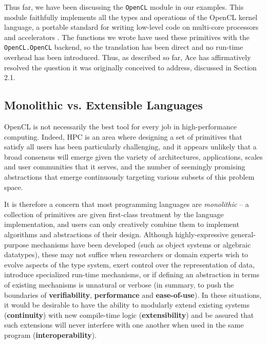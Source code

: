 \documentclass[9pt,preprint]{sigplanconf}
\begin{document}
Thus far, we have been discussing the \verb|OpenCL| module in our examples. This module faithfully implements all the types and operations of the OpenCL kernel language, a portable standard for writing low-level code on multi-core processors and accelerators \cite{opencl11}. The functions we wrote have used these primitives with the \verb|OpenCL.OpenCL| backend, so the translation has been direct and no run-time overhead has been introduced. Thus, as described so far, Ace has affirmatively resolved the question it was originally conceived to address, discussed in Section 2.1. 

\subsection{Monolithic vs. Extensible Languages}
OpenCL is not necessarily the best tool for every job in high-performance computing. Indeed, HPC is an area where designing a set of primitives that satisfy all users has been particularly challenging, and it appears unlikely that a broad consensus will emerge given the variety of architectures, applications, scales and user communities that it serves, and the number of seemingly promising abstractions that emerge continuously targeting various subsets of this problem space.

It is therefore a concern that most programming languages are {\em monolithic} -- a collection of primitives are given first-class treatment by the language implementation, and users can only creatively combine them to implement algorithms and abstractions of their design. Although highly-expressive general-purpose mechanisms have been developed (such as object systems or algebraic datatypes), these may not suffice when researchers or domain experts wish to evolve aspects of the type system, exert control over the representation of data, introduce specialized run-time mechanisms, or if defining an abstraction in terms of existing mechanisms is unnatural or verbose (in summary, to push the boundaries of \textbf{verifiability}, \textbf{performance} and \textbf{ease-of-use}). In these situations, it would be desirable to have the ability to modularly extend existing systems (\textbf{continuity}) with new compile-time logic (\textbf{extensibility}) and be assured that such extensions will never interfere with one another when used in the same program (\textbf{interoperability}).

\end{document}
